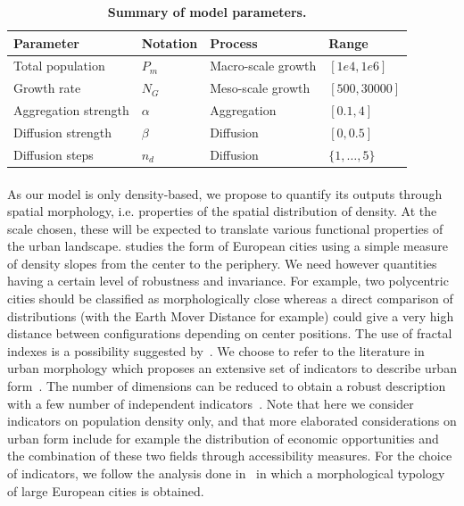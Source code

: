 \documentclass[10pt,letterpaper]{article}
\begin{document}
\begin{table}[!ht]
\caption{{\bf Summary of model parameters.}}
\begin{tabular}{|l|l|l|l|}
\hline
Parameter & Notation & Process & Range\\ \hline
Total population & $P_m$ & Macro-scale growth & $[1e4,1e6]$\\ \hline
Growth rate & $N_G$ & Meso-scale growth  & $[500,30000]$\\ \hline
Aggregation strength & $\alpha$ & Aggregation & $[0.1,4]$\\ \hline
Diffusion strength & $\beta$ & Diffusion & $[0,0.5]$\\ \hline
Diffusion steps & $n_d$ & Diffusion & $\{1,\ldots , 5\}$\\ \hline
\end{tabular}
\label{tab:parameters}
\end{table}


\paragraph*{}


As our model is only density-based, we propose to quantify its outputs through spatial morphology, i.e. properties of the spatial distribution of density. At the scale chosen, these will be expected to translate various functional properties of the urban landscape. \cite{guerois2008built} studies the form of European cities using a simple measure of density slopes from the center to the periphery. We need however quantities having a certain level of robustness and invariance. For example, two polycentric cities should be classified as morphologically close whereas a direct comparison of distributions (with the Earth Mover Distance for example) could give a very high distance between configurations depending on center positions. The use of fractal indexes is a possibility suggested by~\cite{2016arXiv160808839C}. We choose to refer to the literature in urban morphology which proposes an extensive set of indicators to describe urban form~\cite{tsai2005quantifying}. The number of dimensions can be reduced to obtain a robust description with a few number of independent indicators~\cite{Schwarz201029}. Note that here we consider indicators on population density only, and that more elaborated considerations on urban form include for example the distribution of economic opportunities and the combination of these two fields through accessibility measures. For the choice of indicators, we follow the analysis done in~\cite{le2015forme} in which a morphological typology of large European cities is obtained.
\end{document}
